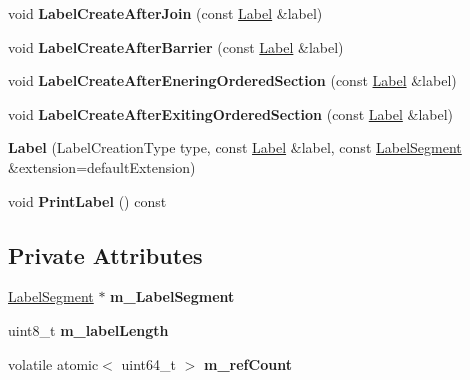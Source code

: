 \begin{DoxyCompactItemize}
\item 
\hypertarget{classLabel_ae17efa5ab74875313f0ee39e36c1aae6}{void {\bfseries Label\-Create\-After\-Join} (const \hyperlink{classLabel}{Label} \&label)}\label{classLabel_ae17efa5ab74875313f0ee39e36c1aae6}

\item 
\hypertarget{classLabel_a02c946f6049061e9403210f63a291747}{void {\bfseries Label\-Create\-After\-Barrier} (const \hyperlink{classLabel}{Label} \&label)}\label{classLabel_a02c946f6049061e9403210f63a291747}

\item 
\hypertarget{classLabel_a42bdbc380e214b539c5b8db861fd6757}{void {\bfseries Label\-Create\-After\-Enering\-Ordered\-Section} (const \hyperlink{classLabel}{Label} \&label)}\label{classLabel_a42bdbc380e214b539c5b8db861fd6757}

\item 
\hypertarget{classLabel_a28873ccfd689391e0bd46f2a9bd5719e}{void {\bfseries Label\-Create\-After\-Exiting\-Ordered\-Section} (const \hyperlink{classLabel}{Label} \&label)}\label{classLabel_a28873ccfd689391e0bd46f2a9bd5719e}

\item 
\hypertarget{classLabel_a0e238fe9836ba9f4be1af22ee64599ff}{{\bfseries Label} (Label\-Creation\-Type type, const \hyperlink{classLabel}{Label} \&label, const \hyperlink{structLabelSegment}{Label\-Segment} \&extension=default\-Extension)}\label{classLabel_a0e238fe9836ba9f4be1af22ee64599ff}

\item 
\hypertarget{classLabel_aa548453871aa09bb2e6d6244c53054d9}{void {\bfseries Print\-Label} () const }\label{classLabel_aa548453871aa09bb2e6d6244c53054d9}

\end{DoxyCompactItemize}
\subsection*{Private Attributes}
\begin{DoxyCompactItemize}
\item 
\hypertarget{classLabel_a1676b7ea6b1e67e8c0c8ba762c23fec2}{\hyperlink{structLabelSegment}{Label\-Segment} $\ast$ {\bfseries m\-\_\-\-Label\-Segment}}\label{classLabel_a1676b7ea6b1e67e8c0c8ba762c23fec2}

\item 
\hypertarget{classLabel_adaef34df8bbdb59687139262ed25b644}{uint8\-\_\-t {\bfseries m\-\_\-label\-Length}}\label{classLabel_adaef34df8bbdb59687139262ed25b644}

\item 
\hypertarget{classLabel_a9412617cd8470d7d2f4ac32f0530a50f}{volatile atomic$<$ uint64\-\_\-t $>$ {\bfseries m\-\_\-ref\-Count}}\label{classLabel_a9412617cd8470d7d2f4ac32f0530a50f}

\end{DoxyCompactItemize}


